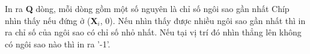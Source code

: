 In ra \textbf{Q} dòng, mỗi dòng gồm một số nguyên là chỉ số ngôi sao gần nhất Chíp nhìn thấy nếu đứng ở (\textbf{X$_i$}, 0). Nếu nhìn thấy được nhiều ngôi sao gần nhất thì in ra chỉ số của ngôi sao có chỉ số nhỏ nhất. Nếu tại vị trí đó nhìn thẳng lên không có ngôi sao nào thì in ra '-1'.